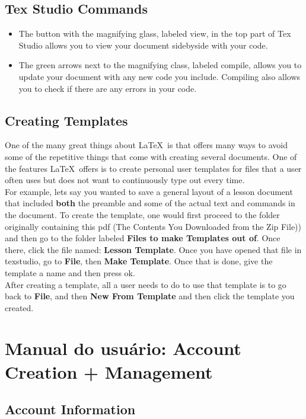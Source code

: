 \documentclass[12pt,hidelinks]{article}
\begin{document}
	\subsection{Tex Studio Commands}
		\begin{itemize}
			\item The button with the magnifying glass, labeled view, in the top part of Tex Studio allows you to view your document sidebyside with your code.
			\item The green arrows next to the magnifying class, labeled compile, allows you to update your document with any new code you include. Compiling also allows you to check if there are any errors in your code.  
		\end{itemize}
	\subsection{Creating Templates}
		One of the many great things about \LaTeX\ is that offers many ways to avoid some of the repetitive things that come with creating several documents. One of the features \LaTeX\ offers is to create personal user templates for files that a user often uses but does not want to continuously type out every time.\\
		For example, lets say you wanted to save a general layout of a lesson document that included \textbf{both} the preamble and some of the actual text and commands in the document. 
		To create the template, one would first proceed to the folder originally containing this pdf (The Contents You Downloaded from the Zip File)) and then go to the folder labeled \textbf{Files to make Templates out of}. Once there, click the file named: \textbf{Lesson Template}. Once you have opened that file in texstudio, go to \textbf{File}, then \textbf{Make Template}. Once that is done, give the template a name and then press ok.\\
		After creating a template, all a user needs to do to use that template is to go back to \textbf{File}, and then \textbf{New From Template} and then click the template you created.
	\vspace{-1.5mm}
\newpage
\section{Manual do usuário: Account Creation + Management}
\vspace{10.5cm}

	\subsection{Account Information}
     	
\end{document}

